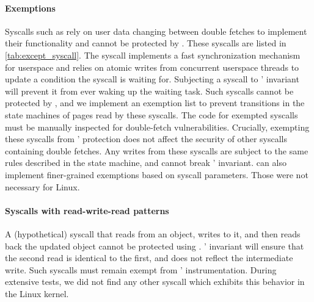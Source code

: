 \paragraph{Exemptions}
Syscalls such as  rely on user data changing between double
fetches to implement their functionality and cannot be protected by
\midas.
These syscalls are listed in \autoref{tab:except_syscall}.
The  syscall implements a fast synchronization mechanism
for userspace and relies on atomic writes from concurrent userspace
threads to update a condition the syscall is waiting for.
Subjecting a  syscall to \midas' invariant will prevent
it from ever waking up the waiting task.
Such syscalls cannot be protected by \midas, and we implement an
exemption list to prevent transitions in the state machines of pages read
by these syscalls.
The code for exempted syscalls must be manually inspected for double-fetch
vulnerabilities.
Crucially, exempting these syscalls from \midas' protection does not
affect the security of other syscalls containing double fetches.
Any writes from these syscalls are subject to the same rules described
in the state machine, and cannot break \midas' invariant.
\midas can also implement finer-grained exemptions based on syscall
parameters. Those were not necessary for Linux.
%


\paragraph{Syscalls with read-write-read patterns}
A (hypothetical) syscall that reads from an object, writes to it, and
then reads back the updated object cannot be protected using \midas.
\midas' invariant will ensure that the second read is identical to the first,
and does not reflect the intermediate write.
Such syscalls must remain exempt from \midas' instrumentation.
During extensive tests, we did not find any other syscall which exhibits this behavior in the Linux
kernel.


